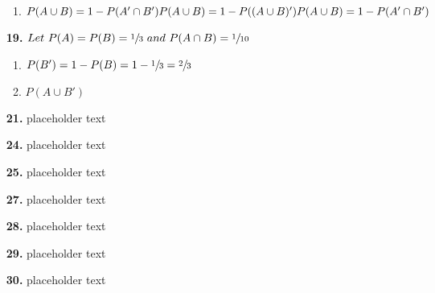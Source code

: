 \documentclass{article}
\begin{document}
\begin{enumerate}
\begin{enumerate}
        \item  \( P(A \cup B) = 1-P(A' \cap B') \\ \\ 
        P(A \cup B) = 1-P((A \cup B)') \\ \\
        P(A \cup B) = 1-P(A' \cap B') 
        \)
    \end{enumerate}
    


\item[\textbf{19.}] \( Let \ P(A) = P(B) = \sfrac{1}{3} \ and \ P(A \cap B ) = \sfrac{1}{10}     \)
    \begin{enumerate}
        \item \( P(B') = 1 - P(B) = 1 - \sfrac{1}{3} = \sfrac{2}{3}\)
        
        \item \( P(A \cup B')                         \)
     \end{enumerate}
    
    

\item[\textbf{21.}]
placeholder text

\item[\textbf{24.}]
placeholder text

\item[\textbf{25.}]
placeholder text

\item[\textbf{27.}]
placeholder text

\item[\textbf{28.}]
placeholder text

\item[\textbf{29.}]
placeholder text

\item[\textbf{30.}]
placeholder text

\end{enumerate}
\end{document}
